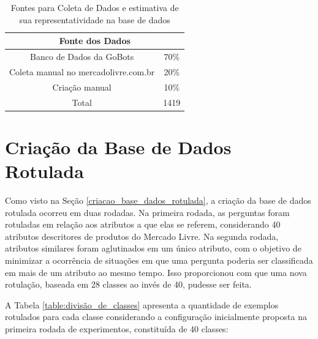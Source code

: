 \begin{center}
\begin{table}[!ht]
\caption{Fontes para Coleta de Dados e estimativa de sua representatividade na base de dados}
\label{table:coleta de dados}
\centering
    \begin{tabular}{|c|c|} 
     \hline
     \multicolumn{2}{|c|}{Fonte dos Dados} \\
     \hline
     Banco de Dados da GoBots & 70\% \\ 
     \hline
     Coleta manual no mercadolivre.com.br & 20\% \\
     \hline
     Criação manual & 10\% \\
     \hline
     Total & 1419 \\
     \hline
    \end{tabular}
\end{table}
\end{center}

\section{Criação da Base de Dados Rotulada}
\label{res:criacao_base_dados_rotulada}
Como visto na Seção \ref{criacao_base_dados_rotulada}, a criação da base de dados rotulada ocorreu em duas rodadas. Na primeira rodada, as perguntas foram rotuladas em relação aos atributos a que elas se referem, considerando 40 atributos descritores de produtos do Mercado Livre. Na segunda rodada, atributos similares foram aglutinados em um único atributo, com o objetivo de minimizar a ocorrência de situações em que uma pergunta poderia ser classificada em mais de um atributo ao mesmo tempo. Isso proporcionou com que uma nova rotulação, baseada em 28 classes ao invés de 40, pudesse ser feita. 

A Tabela \ref{table:divisão_de_classes} apresenta a quantidade de exemplos rotulados para cada classe considerando a configuração inicialmente proposta na primeira rodada de experimentos, constituída de 40 classes:

